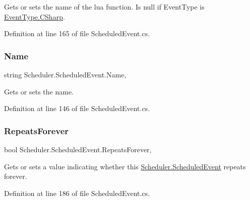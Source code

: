 Gets or sets the name of the lua function. Is null if Event\+Type is \hyperlink{namespace_scheduler_a85a4e27de37756a9765a49f3b3e4ba81a83925001a044cdfe0c64e9a44345b66d}{Event\+Type.\+C\+Sharp}. 



Definition at line 165 of file Scheduled\+Event.\+cs.

\mbox{\label{class_scheduler_1_1_scheduled_event_aa7173affda869088f36087fe308aa21f}} 
\subsubsection{\texorpdfstring{Name}{Name}}
{\footnotesize\ttfamily string Scheduler.\+Scheduled\+Event.\+Name\hspace{0.3cm}{\ttfamily [get]}, {}}



Gets or sets the name. 



Definition at line 146 of file Scheduled\+Event.\+cs.

\mbox{\label{class_scheduler_1_1_scheduled_event_af7a0bb8b8b2962df9af5e549d1b3d178}} 
\subsubsection{\texorpdfstring{Repeats\+Forever}{RepeatsForever}}
{\footnotesize\ttfamily bool Scheduler.\+Scheduled\+Event.\+Repeats\+Forever\hspace{0.3cm}{\ttfamily [get]}, {}}



Gets or sets a value indicating whether this \hyperlink{class_scheduler_1_1_scheduled_event}{Scheduler.\+Scheduled\+Event} repeats forever. 



Definition at line 186 of file Scheduled\+Event.\+cs.

\mbox{\label{class_scheduler_1_1_scheduled_event_aef67aa8b357363a78a4dd88e228c7bd7}} 

